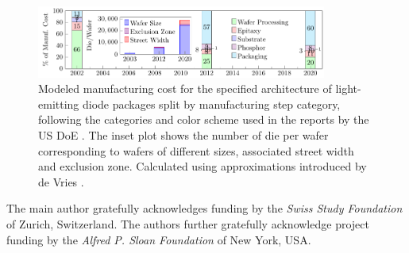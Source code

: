 \documentclass[a4paper,nocompress]{spie}  %
\begin{document}
\begin{figure} [ht]
    \begin{center}
        \includegraphics[width=0.85\textwidth]{SPIE/article/costmodel_calibration.pdf}
    \end{center}
    \caption{Modeled manufacturing cost for the specified architecture of light-emitting diode packages split by manufacturing step category, following the categories and color scheme used in the reports by the US DoE \cite{doe2016solid}. The inset plot shows the number of die per wafer corresponding to wafers of different sizes, associated street width and exclusion zone. Calculated using approximations introduced by de Vries \cite{deVries2005}.}
    \label{fig:cost}
\end{figure}


\acknowledgments %
 
The main author gratefully acknowledges funding by the \textit{Swiss Study Foundation} of Zurich, Switzerland. The authors further gratefully acknowledge project funding by the \textit{Alfred P. Sloan Foundation} of New York, USA.

\clearpage
\end{document}
